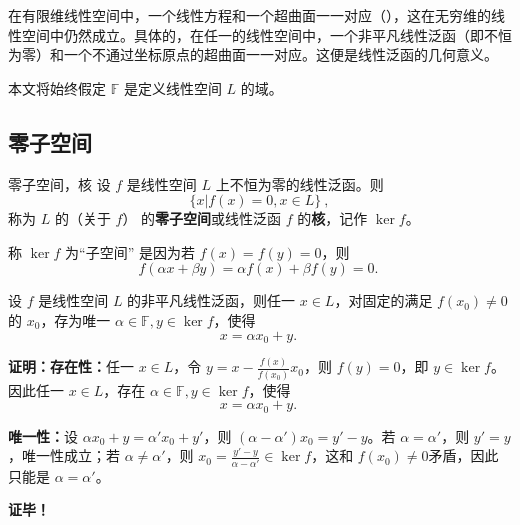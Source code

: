 
在有限维线性空间中，一个线性方程和一个超曲面一一对应（），这在无穷维的线性空间中仍然成立。具体的，在任一的线性空间中，一个非平凡线性泛函（即不恒为零）和一个不通过坐标原点的超曲面一一对应。这便是线性泛函的几何意义。

本文将始终假定 $\mathbb F$ 是定义线性空间 $L$ 的域。

\subsection{零子空间}
\begin{definition}{零子空间，核}
设 $f$ 是线性空间 $L$ 上不恒为零的线性泛函。则
\begin{equation}
\{x|f(x)=0,x\in L\}~,
\end{equation}
称为 $L$ 的（关于 $f$） 的\textbf{零子空间}或线性泛函 $f$ 的\textbf{核}，记作 $\ker f$。
\end{definition}

称 $\ker f$ 为“子空间” 是因为若 $f(x)=f(y)=0$，则 
\begin{equation}
f(\alpha x+\beta y)=\alpha f(x)+\beta f(y)=0.~
\end{equation}


\begin{lemma}{}\label{lem_LiFunG_1}
设 $f$ 是线性空间 $L$ 的非平凡线性泛函，则任一 $x\in L$，对固定的满足 $f(x_0)\neq0$ 的 $x_0$，存为唯一 $\alpha\in\mathbb F,y\in \ker f$，使得
\begin{equation}
x=\alpha x_0+y.~
\end{equation}
\end{lemma}

\textbf{证明：}\textbf{存在性：}任一 $x\in L$，令 $y=x-\frac{f(x)}{f(x_0)}x_0$，则 $f(y)=0$，即 $y\in\ker f$。因此任一 $x\in L$，存在 $\alpha\in\mathbb F,y\in \ker f$，使得
\begin{equation}\label{eq_LiFunG_1}
x=\alpha x_0+y.~
\end{equation}

\textbf{唯一性：}设 $\alpha x_0+y=\alpha' x_0+y'$，则 $(\alpha-\alpha')x_0=y'-y$。若 $\alpha=\alpha'$，则 $y'=y$，唯一性成立；若 $\alpha\neq\alpha'$，则 $x_0=\frac{y'-y}{\alpha-\alpha'}\in\ker f$，这和 $f(x_0)\neq0$矛盾，因此只能是 $\alpha=\alpha'$。 

\textbf{证毕！}

